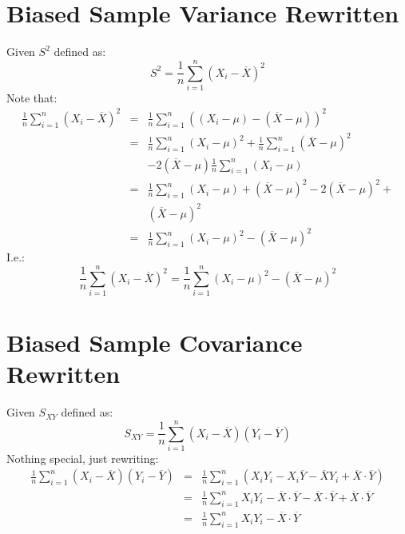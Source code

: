 \documentclass[12pt]{article}
\begin{document}
\section{Biased Sample Variance Rewritten}
Given $S^2$ defined as:
\begin{equation}
\label{biased_variance_estimator}
S^2 = \frac{1}{n}\sum_{i=1}^{n} (X_i - \overline{X})^2
\end{equation}
Note that:
\begin{eqnarray*}
\frac{1}{n}\sum_{i=1}^{n} (X_i - \overline{X})^2 &=& 
\frac{1}{n}\sum_{i=1}^{n}\left( 
(X_i - \mu) - (\overline{X} - \mu)
\right)^2 \\
&=& \frac{1}{n} \sum_{i=1}^{n}(X_i - \mu)^2 + 
\frac{1}{n} \sum_{i=1}^{n}(\overline{X} - \mu)^2 \\
&& - 2 (\overline{X} - \mu) \frac{1}{n} \sum_{i=1}^{n} (X_i - \mu) \\
&=& \frac{1}{n} \sum_{i=1}^{n}(X_i - \mu) + (\overline{X} - \mu)^2 
- 2 (\overline{X} - \mu)^2 + \\ && (\overline{X} - \mu)^2 \\
&=& \frac{1}{n} \sum_{i=1}^{n} (X_i - \mu)^2 - (\overline{X} - \mu)^2
\end{eqnarray*}
I.e.:
\begin{equation}
\label{biased_variance_estimator_decomposition}
\frac{1}{n} \sum_{i=1}^{n} (X_i - \overline{X})^2 = 
\frac{1}{n} \sum_{i=1}^{n} (X_i - \mu)^2 - (\overline{X} - \mu)^2
\end{equation}


\section{Biased Sample Covariance Rewritten}
\label{sec:biased_sample_covariance_rewritten}
Given $S_{XY}$ defined as:
\begin{equation}
\label{biased_variance_estimator}
S_{XY} = \frac{1}{n}\sum_{i=1}^{n} (X_i - \overline{X}) (Y_i - \overline{Y})
\end{equation}
Nothing special, just rewriting:
\begin{eqnarray*}
\frac{1}{n}\sum_{i=1}^{n} (X_i - \overline{X}) (Y_i - \overline{Y}) &=&
\frac{1}{n}\sum_{i=1}^{n}\left(
X_i Y_i - X_i \overline{Y} - \overline{X} Y_i + \overline{X} \cdot \overline{Y} 
\right) \\
&=& \frac{1}{n} \sum_{i=1}^{n} X_i Y_i - \overline{X} \cdot \overline{Y}
- \overline{X} \cdot \overline{Y} + \overline{X} \cdot \overline{Y} \\
&=& \frac{1}{n} \sum_{i=1}^{n} X_i Y_i - \overline{X} \cdot \overline{Y}
\end{eqnarray*}
\end{document}
